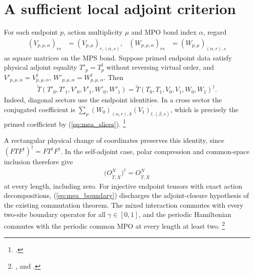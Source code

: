 \documentclass{article}
\begin{document}
\section{A sufficient local adjoint criterion}
For each endpoint $p$, action multiplicity $\mu$ and MPO bond index
$\alpha$, regard
\begin{align}
    (V_{p,\mu,\alpha})_{rs} & =(V_{p,\mu})_{r,(\alpha,s)}, &
    (W_{p,\mu,\alpha})_{rs} & =(W_{p,\mu})_{(\alpha,r),s}
    \label{eq:mea_slices}
\end{align}
as square matrices on the MPS bond. Suppose primed endpoint data
satisfy physical adjoint equality $T'_p=T_p^\dagger$ without
reversing virtual order, and $V'_{p,\mu,\alpha}=V_{p,\mu,\alpha}^\dagger$,
$W'_{p,\mu,\alpha}=W_{p,\mu,\alpha}^\dagger$. Then
\begin{align}
    \widetilde T(T'_0,T'_1,V'_0,V'_1,W'_0,W'_1)
    =\widetilde T(T_0,T_1,V_0,V_1,W_0,W_1)^\dagger.
    \label{eq:mea_dual}
\end{align}
Indeed, diagonal sectors use the endpoint identities. In a cross
sector the conjugated coefficient is
$\sum_\mu\overline{(W_0)_{(\alpha,r),k}}
    \overline{(V_1)_{l,(\beta,s)}}$, which is precisely the primed
coefficient by (\ref{eq:mea_slices}).
\footnote{.}

A rectangular physical change of coordinates preserves this identity,
since $(FTF^\dagger)^\dagger=FT^\dagger F^\dagger$. In the self-adjoint
case, polar compression and common-space inclusion therefore give
\begin{align}
    \bigl(O^N_{\widetilde T,X}\bigr)^\dagger
    =O^N_{\widetilde T,\overline X}
    \label{eq:mea_boundary}
\end{align}
at every length, including zero. For injective endpoint tensors with
exact action decompositions, (\ref{eq:mea_boundary}) discharges the
adjoint-closure hypothesis of the existing commutation theorem. The
mixed interaction commutes with every two-site boundary operator for
all $\gamma\in[0,1]$, and the periodic Hamiltonian commutes with the
periodic common MPO at every length at least two.
\footnote{,
    and
    .}
\end{document}
